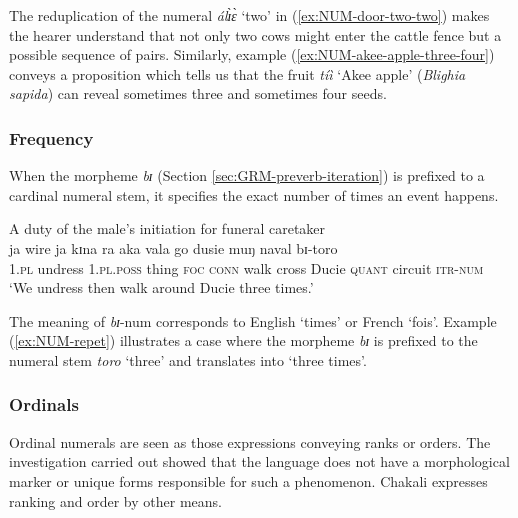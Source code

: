 \begin{exe}
\begin{exe}
\begin{exe}
{\begin{exe}
\begin{exe}
\begin{exe}
\begin{exe}
\begin{exe}
\begin{exe}
\begin{exe}
\begin{xlist}
\begin{exe}
\begin{exe}
\begin{exe}
The reduplication of the numeral {\it álɪ̀ɛ̀} `two' in
(\ref{ex:NUM-door-two-two})
makes the
hearer understand that not only two cows might enter the cattle fence but a
possible sequence of  pairs. Similarly,   example 
(\ref{ex:NUM-akee-apple-three-four}) conveys a proposition which tells us that
the
fruit  {\it tíì}  `Akee apple' (\textit{Blighia sapida}) can reveal sometimes
three
and sometimes
four seeds.




\subsubsection{Frequency}
\label{sec:NUM-repet}

When the morpheme {\it bɪ}  (Section
\ref{sec:GRM-preverb-iteration}) is prefixed to a cardinal numeral  stem, it
specifies the exact number of times an event happens. 

 


\ea\label{ex:NUM-repet}{\rm A duty of the male's initiation for  funeral
caretaker}\\
 \gll ja wire ja kɪna ra aka vala go dusie muŋ naval bɪ-toro\\
 \textsc{1.pl} undress  \textsc{1.pl.poss} thing    \textsc{foc}  \textsc{conn} 
walk cross Ducie  \textsc{quant} circuit \textsc{itr-num} \\
\glt  `We undress then walk around Ducie three times.'
\z


The meaning of {\it bɪ}-{\sc num} corresponds to English `times' or  French 
`fois'.  Example (\ref{ex:NUM-repet}) illustrates a  case where  the morpheme 
{\it bɪ} is prefixed to the numeral stem {\it toro} `three' and translates into 
`three times'.



\subsubsection{Ordinals}
\label{sec:NUM-partitive}

Ordinal numerals are seen as those expressions conveying ranks or orders. The
investigation carried out  showed that the language
does not have a morphological marker or unique forms responsible for such a
phenomenon. Chakali expresses ranking and order by other
means.




\end{exe}
\end{exe}
\end{exe}
\end{xlist}
\end{exe}
\end{exe}
\end{exe}
\end{exe}
\end{exe}
\end{exe}
\end{exe}}
\end{exe}
\end{exe}
\end{exe}
